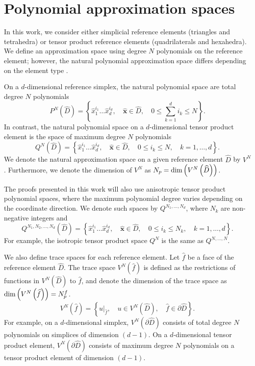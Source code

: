 \documentclass{svjour3}                     %
\renewcommand{\hat}{\widehat}
\newcommand{\LRp}[1]{\left( #1 \right)}
\newcommand{\LRc}[1]{\left\{ #1 \right\}}
\begin{document}
\section{Polynomial approximation spaces}
\label{sec:approx}

In this work, we consider either simplicial reference elements (triangles and tetrahedra) or tensor product reference elements (quadrilaterals and hexahedra).  We define an approximation space using degree $N$ polynomials on the reference element; however, the natural polynomial approximation space differs depending on the element type \cite{chan2015gpu}.

On a $d$-dimensional reference simplex, the natural polynomial space are total degree $N$ polynomials 
\[
P^N\LRp{\hat{D}} = \LRc{\hat{x}_1^{i_1}\ldots\hat{x}_d^{i_d}, \quad \hat{\bm{x}} \in \hat{D}, \quad 0\leq \sum_{k=1}^d i_k \leq N}.
\]
In contrast, the natural polynomial space on a $d$-dimensional tensor product element is the space of maximum degree $N$ polynomials
\[
Q^N\LRp{\hat{D}} = \LRc{\hat{x}_1^{i_1}\ldots\hat{x}_d^{i_d}, \quad \hat{\bm{x}} \in \hat{D}, \quad 0\leq i_k \leq N, \quad k = 1,\ldots, d}.
\]
We denote the natural approximation space on a given reference element $\hat{D}$ by $V^N$.  Furthermore, we denote the dimension of $V^N$ as $N_p = {\rm dim}\LRp{V^N\LRp{\hat{D}}}$.  

The proofs presented in this work will also use anisotropic tensor product polynomial spaces, where the maximum polynomial degree varies depending on the coordinate direction.  We denote such spaces by $Q^{N_1, \ldots, N_d}$, where $N_k$ are non-negative integers and
\[
Q^{N_1, N_2, \ldots, N_d}\LRp{\hat{D}} = \LRc{\hat{x}_1^{i_1}\ldots\hat{x}_d^{i_d}, \quad \hat{\bm{x}} \in \hat{D}, \quad 0\leq i_k \leq N_k, \quad k = 1,\ldots, d}.
\]
For example, the isotropic tensor product space $Q^N$ is the same as $Q^{N,\ldots,N}$.

We also define trace spaces for each reference element.  Let $\hat{f}$ be a face of the reference element $\hat{D}$.  The trace space $V^N \LRp{\hat{f}}$ is defined as the restrictions of functions in $V^N\LRp{\hat{D}}$ to $\hat{f}$, and denote the dimension of the trace space as ${\rm dim}\LRp{V^N\LRp{{\hat{f}}}} = N^f_p$.  
\[
V^N \LRp{\hat{f}} = \LRc{ \left.u\right|_{\hat{f}}, \quad u \in V^N\LRp{\hat{D}}, \quad \hat{f}\in \partial\hat{D}}.
\]
For example, on a $d$-dimensional simplex, $V^N \LRp{\partial \hat{D}}$ consists of total degree $N$ polynomials on simplices of dimension $(d-1)$.  On a $d$-dimensional tensor product element, $V^N \LRp{\partial \hat{D}}$ consists of maximum degree $N$ polynomials on a tensor product element of dimension $(d-1)$.  
\end{document}
